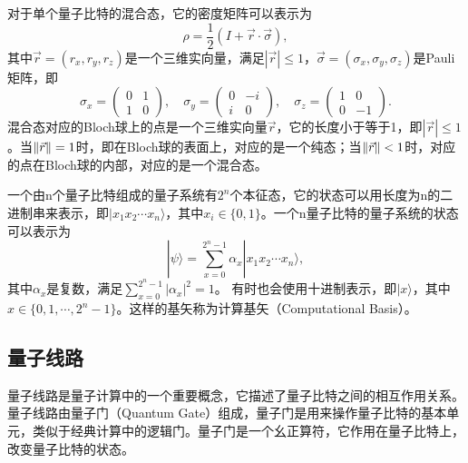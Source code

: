 对于单个量子比特的混合态，它的密度矩阵可以表示为
\begin{equation}\label{eq:bloch_rho}
    \rho = \frac{1}{2}(I + \vec{r}\cdot\vec{\sigma}),
\end{equation}
其中$\vec{r} = (r_x, r_y, r_z)$是一个三维实向量，满足$|\vec{r}| \leq 1$，$\vec{\sigma} = (\sigma_x, \sigma_y, \sigma_z)$是Pauli矩阵，即
\begin{equation}
    \sigma_x = \begin{pmatrix} 0 & 1 \\ 1 & 0 \end{pmatrix}, \quad \sigma_y = \begin{pmatrix} 0 & -i \\ i & 0 \end{pmatrix}, \quad \sigma_z = \begin{pmatrix} 1 & 0 \\ 0 & -1 \end{pmatrix}.
\end{equation}
混合态对应的Bloch球上的点是一个三维实向量$\vec{r}$，它的长度小于等于1，即$|\vec{r}| \leq 1$。当$\norm{\vec{r}} = 1$时，即在Bloch球的表面上，对应的是一个纯态；当$\norm{\vec{r}} < 1$时，对应的点在Bloch球的内部，对应的是一个混合态。


一个由n个量子比特组成的量子系统有$2^n$个本征态，它的状态可以用长度为n的二进制串来表示，即$|x_1x_2\cdots x_n\rangle$，其中$x_i \in \{0, 1\}$。一个n量子比特的量子系统的状态可以表示为
\begin{equation}
    |\psi\rangle = \sum_{x=0}^{2^n-1} \alpha_x |x_1x_2\cdots x_n\rangle,
\end{equation}
其中$\alpha_x$是复数，满足$\sum_{x=0}^{2^n-1} |\alpha_x|^2 = 1$。
有时也会使用十进制表示，即$|x\rangle$，其中$x \in \{0, 1, \cdots, 2^n-1\}$。这样的基矢称为计算基矢（Computational Basis）。

\subsection{量子线路}
量子线路是量子计算中的一个重要概念，它描述了量子比特之间的相互作用关系。量子线路由量子门（Quantum Gate）组成，量子门是用来操作量子比特的基本单元，类似于经典计算中的逻辑门。量子门是一个幺正算符，它作用在量子比特上，改变量子比特的状态。

